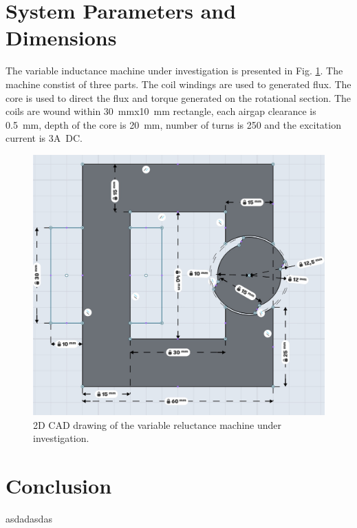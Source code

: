 \documentclass{article}
\begin{document}
\section{System Parameters and Dimensions}
The variable inductance machine under investigation is presented in Fig. \ref{fig:system}. The machine constist of three parts. The coil windings are used to generated flux. The core is used to direct the flux and torque generated on the rotational section. The coils are wound within 30~mmx10~mm rectangle, each airgap clearance is 0.5~mm, depth of the core is 20~mm, number of turns is 250 and the excitation current is 3A~DC.
\begin{figure}[h!]
	\centering
	\includegraphics[width=1\linewidth]{Figurler/system.jpeg}
	\caption{2D CAD drawing of the variable reluctance machine under investigation.}
	\label{fig:system}
\end{figure}



\section{Conclusion}

asdadasdas
\end{document}
